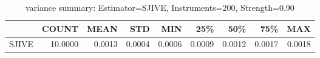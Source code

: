 \begin{table}[ht]
\centering
\caption{variance summary: Estimator=SJIVE, Instruments=200, Strength=0.90}
\begin{tabular}{lrrrrrrrr}
\toprule
 & COUNT & MEAN & STD & MIN & 25\% & 50\% & 75\% & MAX \\
\midrule
SJIVE & 10.0000 & 0.0013 & 0.0004 & 0.0006 & 0.0009 & 0.0012 & 0.0017 & 0.0018 \\
\bottomrule
\end{tabular}
\end{table}

